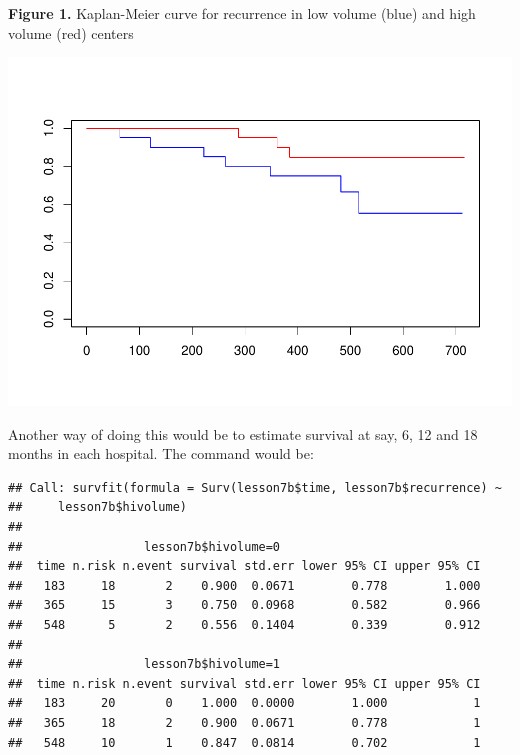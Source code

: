 \documentclass[]{book}
\newenvironment{Shaded}{\begin{snugshade}}{\end{snugshade}}
\newcommand{\DataTypeTok}[1]{\textcolor[rgb]{0.13,0.29,0.53}{#1}}
\newcommand{\DecValTok}[1]{\textcolor[rgb]{0.00,0.00,0.81}{#1}}
\newcommand{\KeywordTok}[1]{\textcolor[rgb]{0.13,0.29,0.53}{\textbf{#1}}}
\newcommand{\NormalTok}[1]{#1}
\newcommand{\OperatorTok}[1]{\textcolor[rgb]{0.81,0.36,0.00}{\textbf{#1}}}
\newcommand{\StringTok}[1]{\textcolor[rgb]{0.31,0.60,0.02}{#1}}
\begin{document}
\textbf{Figure 1.} Kaplan-Meier curve for recurrence in low volume (blue) and high volume (red) centers

\includegraphics{09-answers_files/figure-latex/week7q-1.pdf}

Another way of doing this would be to estimate survival at say, 6, 12 and 18 months in each hospital. The command would be:

\begin{Shaded}
\end{Shaded}

\begin{verbatim}
## Call: survfit(formula = Surv(lesson7b$time, lesson7b$recurrence) ~ 
##     lesson7b$hivolume)
## 
##                 lesson7b$hivolume=0 
##  time n.risk n.event survival std.err lower 95% CI upper 95% CI
##   183     18       2    0.900  0.0671        0.778        1.000
##   365     15       3    0.750  0.0968        0.582        0.966
##   548      5       2    0.556  0.1404        0.339        0.912
## 
##                 lesson7b$hivolume=1 
##  time n.risk n.event survival std.err lower 95% CI upper 95% CI
##   183     20       0    1.000  0.0000        1.000            1
##   365     18       2    0.900  0.0671        0.778            1
##   548     10       1    0.847  0.0814        0.702            1
\end{verbatim}
\end{document}
